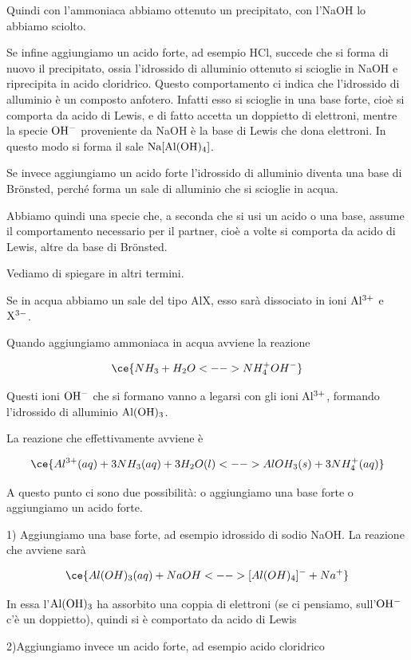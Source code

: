 Quindi con l'ammoniaca abbiamo ottenuto un precipitato, con l'NaOH lo abbiamo sciolto.

Se infine aggiungiamo un acido forte, ad esempio HCl, succede che si forma di nuovo il precipitato, ossia l'idrossido di alluminio ottenuto si scioglie in NaOH e riprecipita in acido cloridrico. Questo comportamento ci indica che l'idrossido di alluminio è un composto anfotero. Infatti esso si scioglie in una base forte, cioè si comporta da acido di Lewis, e di fatto accetta un doppietto di elettroni, mentre la specie $\rm OH^-$ proveniente da NaOH è la base di Lewis che dona elettroni. In questo modo si forma il sale $\rm Na[Al(OH)_4]$.

Se invece aggiungiamo un acido forte l'idrossido di alluminio diventa una base di Brönsted, perché forma un sale di alluminio che si scioglie in acqua.

Abbiamo quindi una specie che, a seconda che si usi un acido o una base, assume il comportamento necessario per il partner, cioè a volte si comporta da acido di Lewis, altre da base di Brönsted.

\vspace{0.2cm}Vediamo di spiegare in altri termini.

Se in acqua abbiamo un sale del tipo AlX, esso sarà dissociato in ioni $\rm Al^{3+}$ e $\rm X^{3-}$.

Quando aggiungiamo ammoniaca in acqua avviene la reazione

$$\ce{NH_3 + H_2O <--> NH_4^+ OH^-}$$

Questi ioni $\rm OH^-$ che si formano vanno a legarsi con gli ioni $\rm Al^{3+}$, formando l'idrossido di alluminio $\rm Al(OH)_3$.

La reazione che effettivamente avviene è

$$\ce{Al^{3+}(aq) + 3NH_3(aq) + 3H_2O(l) <--> AlOH_3(s) + 3NH_4^+(aq)}$$

A questo punto ci sono due possibilità: o aggiungiamo una base forte o aggiungiamo un acido forte.

\vspace{0.2cm}1) Aggiungiamo una base forte, ad esempio idrossido di sodio NaOH. La reazione che avviene sarà

$$\ce{Al(OH)_3(aq) + NaOH <--> [Al(OH)_4]^- + Na^+}$$

In essa l'$\rm Al(OH)_3$ ha assorbito una coppia di elettroni (se ci pensiamo, sull'$\rm OH^-$ c'è un doppietto), quindi si è comportato da acido di Lewis

\vspace{0.2cm}2)Aggiungiamo invece un acido forte, ad esempio acido cloridrico

